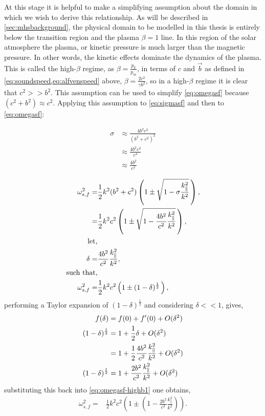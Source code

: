 At this stage it is helpful to make a simplifying assumption about the domain in which we wish to derive this relationship.
As will be described in \cref{sec:mhsbackground}, the physical domain to be modelled in this thesis is entirely below the transition region and the plasma $\beta = 1$ line.
In this region of the solar atmosphere the plasma, or kinetic pressure is much larger than the magnetic pressure.
In other words, the kinetic effects dominate the dynamics of the plasma.
This is called the high-$\beta$ regime, as $\displaystyle\beta = \frac{p_k}{p_m}$, in terms of $c$ and $\vec{b}$ as defined in \cref{eq:soundspeed,eq:alfvenspeed} above, $\displaystyle\beta = \frac{2c^2}{\gamma b^2}$, so in a high-$\beta$ regime it is clear that $c^2 >> b^2$.
This assumption can be used to simplify \cref{eq:omegasf} because $(c^2 + b^2) \approx c^2$.
Applying this assumption to \cref{eq:sigmasf} and then to \cref{eq:omegasf}:

\begin{align}
    \sigma &\approx \frac{4b^2c^2}{(b^2+c^2)^2}\\
           &\approx \frac{4b^2c^2}{c^4}\\
           &\approx \frac{4b^2}{c^2}
\end{align}

\begin{align}
    \omega^2_{s,f} =& \frac{1}{2}k^2(b^2+c^2)\left(1 \pm \sqrt{1 - \sigma \frac{k^2_\parallel}{k^2}}\,\right),\\
                   =& \frac{1}{2}k^2c^2\left(1 \pm \sqrt{1 - \frac{4b^2}{c^2} \frac{k^2_\parallel}{k^2}}\,\right),\\
    \text{let,}\notag\\
    \delta =& \frac{4b^2}{c^2} \frac{k^2_\parallel}{k^2},\notag\\
    \text{such that,}\notag\\                   %
    \omega^2_{s,f} =& \frac{1}{2}k^2c^2\left(1 \pm (1 - \delta)^{\frac{1}{2}}\,\right),\label{eq:omegasf-highb1}
\end{align}
performing a Taylor expansion of $(1-\delta)^{\frac{1}{2}}$ and considering $\delta << 1$, gives,
\begin{align}
    f(\delta) &= f(0) + f^\prime(0) + O(\delta^2)\notag\\
    (1-\delta)^{\frac{1}{2}} &= 1 + \frac{1}{2}\delta + O(\delta^2)\\
                             &= 1 + \frac{1}{2}\frac{4b^2}{c^2} \frac{k^2_\parallel}{k^2} + O(\delta^2)\\
    (1-\delta)^{\frac{1}{2}} &= 1 + \frac{2b^2}{c^2} \frac{k^2_\parallel}{k^2} + O(\delta^2)
\end{align}
substituting this back into \cref{eq:omegasf-highb1} one obtains,
\begin{align}
    \omega^2_{s,f} =& \frac{1}{2}k^2c^2\left(1 \pm \left(1 - \frac{2b^2}{c^2} \frac{k^2_\parallel}{k^2}\right)\right).
\end{align}

